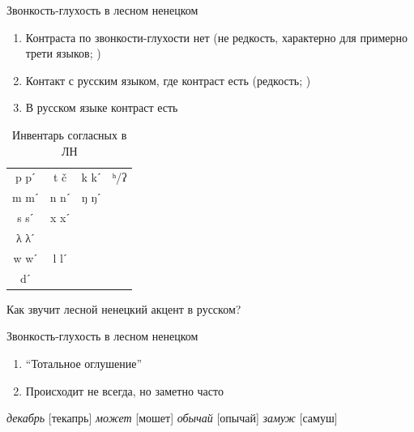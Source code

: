 \documentclass[10 pt, handout]{beamer}
\begin{document}
\begin{frame}{Звонкость-глухость в лесном ненецком}

	\begin{enumerate}[$\gg$]
		\item Контраста по звонкости-глухости нет (не редкость, характерно для примерно трети языков; \cite{wals-4})
		\item Контакт с русским языком, где контраст есть (редкость; \cite{broselow2018})
		\item В русском языке контраст есть
	\end{enumerate}
	
\begin{table}[H]
\begin{tabular}{cccc}
p pˊ & t č  & k kˊ & ʰ/ʔ \\
m mˊ & n nˊ & ŋ ŋˊ &     \\
s sˊ & x xˊ &      &     \\
λ λˊ &      &      &     \\
w wˊ & l lˊ &      &     \\
dˊ   &      &      &    
\end{tabular}
\caption{Инвентарь согласных в ЛН}
\end{table}

	\vfill
	Как звучит лесной ненецкий акцент в русском?
	
\end{frame}

\begin{frame}{Звонкость-глухость в лесном ненецком}

	\begin{enumerate}[$\gg$]
		\item ``Тотальное оглушение''
		\item Происходит не всегда, но заметно часто
	\end{enumerate}
	
	\pex
		\a \emph{декабрь} {[текапрь]}
		\a \emph{может} {[мошет]}
		\a \emph{обычай} {[опычай]}
		\a \emph{замуж} {[самуш]}
	\xe
	
\end{frame}
\end{document}
